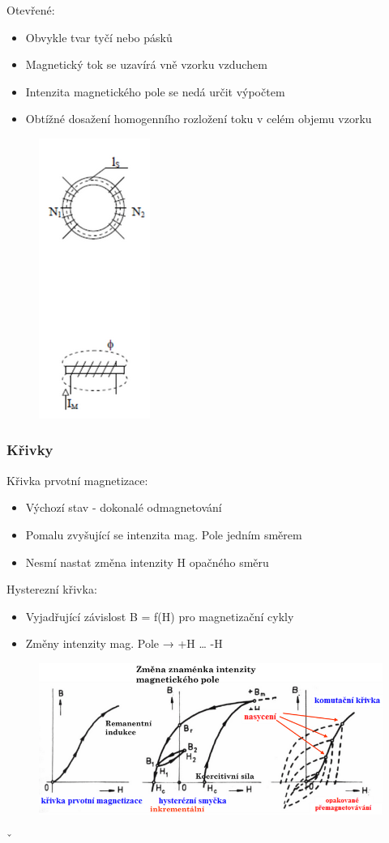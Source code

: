 Otevřené:
\begin{itemize}
    \item Obvykle tvar tyčí nebo pásků
    \item Magnetický tok se uzavírá vně vzorku vzduchem
    \item Intenzita magnetického pole se nedá určit výpočtem
    \item Obtížné dosažení homogenního rozložení toku v celém objemu vzorku
\end{itemize}
\begin{figure}[h!]
    \centering
    \includegraphics[scale = 0.6]{images/Vzorky.png}
\end{figure}

\subsubsection{Křivky}
Křivka prvotní magnetizace:
\begin{itemize}
    \item Výchozí stav - dokonalé odmagnetování
    \item Pomalu zvyšující se intenzita mag. Pole jedním směrem
    \item Nesmí nastat změna intenzity H opačného směru
\end{itemize}
Hysterezní křivka:
\begin{itemize}
    \item Vyjadřující závislost B = f(H) pro magnetizační cykly
    \item Změny intenzity mag. Pole → +H … -H
\end{itemize}
\begin{figure}[h!]
    \centering
    \includegraphics[scale = 0.5]{images/KrivkyMag.png}
\end{figure}ˇ

